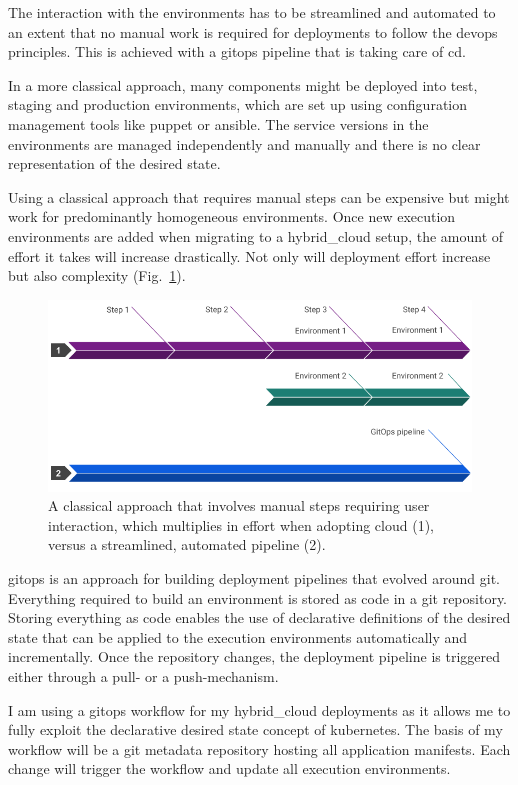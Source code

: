 \documentclass[../main.tex]{subfiles}
\begin{document}
    The interaction with the environments has to be streamlined and automated to an extent that no manual work is required for deployments to follow the \gls{devops} principles.
    This is achieved with a \gls{gitops} pipeline that is taking care of \acrlong{cd}.

    In a more classical approach, many components might be deployed into test, staging and production environments, which are set up using configuration management tools like \gls{puppet} or \gls{ansible}.
    The service versions in the environments are managed independently and manually and there is no clear representation of the desired state.

    Using a classical approach that requires manual steps can be expensive but might work for predominantly homogeneous environments.
    Once new execution environments are added when migrating to a \gls{hybrid_cloud} setup, the amount of effort it takes will increase drastically.
    Not only will deployment effort increase but also complexity (Fig.~\ref{fig:deploy_process_timeline}).

    \begin{figure}[h]
        \centering
        \includegraphics[width=.9\linewidth]{img/concepts_deploy_process_v3.png}
        \captionsetup{justification=centering}
        \caption{
            A classical approach that involves manual steps requiring user interaction, which multiplies in effort when adopting \gls{cloud} (1), versus a streamlined, automated pipeline (2).
        }
        \label{fig:deploy_process_timeline}
    \end{figure}

    \gls{gitops} is an approach for building deployment pipelines that evolved around \gls{git}.
    Everything required to build an environment is stored as code in a \gls{git} repository.
    Storing everything as code enables the use of declarative definitions of the desired state that can be applied to the execution environments automatically and incrementally.
    Once the repository changes, the deployment pipeline is triggered either through a pull- or a push-mechanism.\cite{gitops}

    I am using a \gls{gitops} workflow for my \gls{hybrid_cloud} deployments as it allows me to fully exploit the declarative desired state concept of \gls{kubernetes}.
    The basis of my workflow will be a \gls{git} metadata repository hosting all application manifests.
    Each change will trigger the workflow and update all execution environments.
\end{document}
